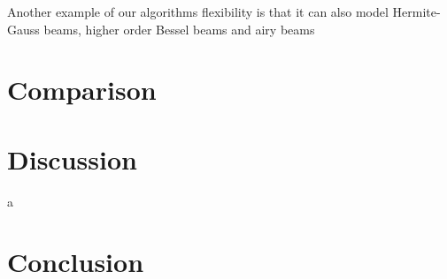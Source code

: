 Another example of our algorithms flexibility is that it can also model Hermite-Gauss beams, higher order Bessel beams and airy beams

\section{Comparison}

\section{Discussion}


a~\cite{mignon2016fractional}
\section{Conclusion}



